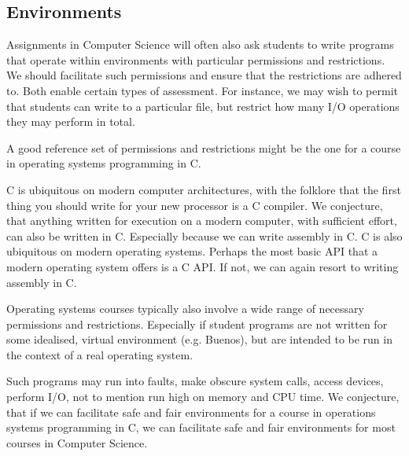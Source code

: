 \subsection{Environments}

Assignments in Computer Science will often also ask students to write programs
that operate within environments with particular permissions and restrictions.
We should facilitate such permissions and ensure that the restrictions are
adhered to. Both enable certain types of assessment. For instance, we may wish
to permit that students can write to a particular file, but restrict how many
I/O operations they may perform in total.

A good reference set of permissions and restrictions might be the one for a
course in operating systems programming in C.

C is ubiquitous on modern computer architectures, with the folklore that the
first thing you should write for your new processor is a C compiler. We
conjecture, that anything written for execution on a modern computer, with
sufficient effort, can also be written in C. Especially because we can write
assembly in C. C is also ubiquitous on modern operating systems. Perhaps the
most basic API that a modern operating system offers is a C API. If not, we can
again resort to writing assembly in C.

Operating systems courses typically also involve a wide range of necessary
permissions and restrictions. Especially if student programs are not written
for some idealised, virtual environment (e.g. Buenos), but are intended to be
run in the context of a real operating system.

Such programs may run into faults, make obscure system calls, access devices,
perform I/O, not to mention run high on memory and CPU time. We conjecture,
that if we can facilitate safe and fair environments for a course in operations
systems programming in C, we can facilitate safe and fair environments for most
courses in Computer Science.
